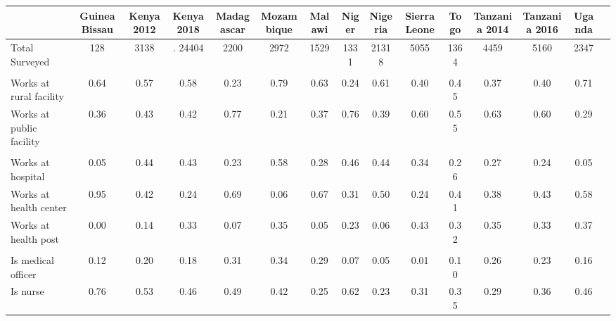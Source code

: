 \def\sym#1{\ifmmode^{#1}\else\(^{#1}\)\fi}
\begin{tabular}{l*{14}{c}}
\hline\hline
&\multicolumn{1}{c}{Guinea Bissau}&\multicolumn{1}{c}{Kenya 2012}&\multicolumn{1}{c}{Kenya 2018}&\multicolumn{1}{c}{Madagascar}&\multicolumn{1}{c}{Mozambique}&\multicolumn{1}{c}{Malawi}&\multicolumn{1}{c}{Niger}&\multicolumn{1}{c}{Nigeria}&\multicolumn{1}{c}{Sierra Leone}&\multicolumn{1}{c}{Togo}&\multicolumn{1}{c}{Tanzania 2014}&\multicolumn{1}{c}{Tanzania 2016}&\multicolumn{1}{c}{Uganda}&\\
\hline
Total Surveyed&                        {128}&        {3138}&. {24404}&      {2200}&        {2972}&        {1529}&        {1331}&        {21318}&        {5055}&        {1364}&       {4459}&       {5160}&       {2347}\\
  &  {}\\
Works at rural facility&       {0.64}&        {0.57}&  {0.58}&  {0.23}&    {0.79}&        {0.63}&        {0.24}&        {0.61}&        {0.40}&        {0.45}&       {0.37}&       {0.40}&       {0.71}\\
Works at public facility&  {0.36}&    {0.43}&  {0.42}&  {0.77}&    {0.21}&        {0.37}&        {0.76}&        {0.39}&        {0.60}&        {0.55}&       {0.63}&       {0.60}&       {0.29}\\
 &   {}\\
Works at hospital&             {0.05}&        {0.44}&  {0.43}&  {0.23}&    {0.58}&        {0.28}&        {0.46}&        {0.44}&        {0.34}&        {0.26}&       {0.27}&       {0.24}&       {0.05}\\
Works at health center&        {0.95}&        {0.42}&  {0.24}&      {0.69}&        {0.06}&        {0.67}&        {0.31}&        {0.50}&        {0.24}&        {0.41}&       {0.38}&       {0.43}&       {0.58}\\
Works at health post&          {0.00}&        {0.14}&  {0.33}&  {0.07}&    {0.35}&        {0.05}&        {0.23}&        {0.06}&        {0.43}&        {0.32}&       {0.35}&       {0.33}&       {0.37}\\
 &   {}\\
Is medical officer&            {0.12}&        {0.20}&  {0.18}&  {0.31}&    {0.34}&        {0.29}&        {0.07}&        {0.05}&        {0.01}&        {0.10}&       {0.26}&       {0.23}&       {0.16}\\
Is nurse&                              {0.76}&        {0.53}&  {0.46}&  {0.49}&    {0.42}&        {0.25}&        {0.62}&        {0.23}&        {0.31}&        {0.35}&       {0.29}&       {0.36}&       {0.46}\\

\end{tabular}
